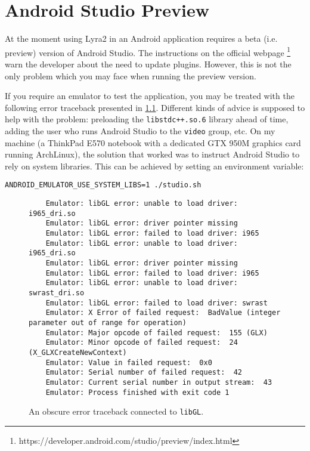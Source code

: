 \chapter{Android Studio Preview}
\label{chapter:problem?}

At the moment using Lyra2 in an Android application requires a beta (i.e. preview) version of Android Studio. The instructions on the official webpage \footnote{https://developer.android.com/studio/preview/index.html} warn the developer about the need to update plugins. However, this is not the only problem which you may face when running the preview version.

If you require an emulator to test the application, you may be treated with the following  error traceback presented in \ref{fig:traceback}. Different kinds of advice is supposed to help with the problem: preloading the \texttt{libstdc++.so.6} library ahead of time, adding the user who runs Android Studio to the \texttt{video} group, etc. On my machine (a ThinkPad E570 notebook with a dedicated GTX 950M graphics card running ArchLinux), the solution that worked was to instruct Android Studio to rely on system libraries. This can be achieved by setting an environment variable:

\begin{verbatim}
ANDROID_EMULATOR_USE_SYSTEM_LIBS=1 ./studio.sh
  \end{verbatim}

\begin{figure}
\begin{verbatim}
    Emulator: libGL error: unable to load driver: i965_dri.so
    Emulator: libGL error: driver pointer missing
    Emulator: libGL error: failed to load driver: i965
    Emulator: libGL error: unable to load driver: i965_dri.so
    Emulator: libGL error: driver pointer missing
    Emulator: libGL error: failed to load driver: i965
    Emulator: libGL error: unable to load driver: swrast_dri.so
    Emulator: libGL error: failed to load driver: swrast
    Emulator: X Error of failed request:  BadValue (integer parameter out of range for operation)
    Emulator: Major opcode of failed request:  155 (GLX)
    Emulator: Minor opcode of failed request:  24 (X_GLXCreateNewContext)
    Emulator: Value in failed request:  0x0
    Emulator: Serial number of failed request:  42
    Emulator: Current serial number in output stream:  43
    Emulator: Process finished with exit code 1
\end{verbatim}
\caption{An obscure error traceback connected to \texttt{libGL}.}
\label{fig:traceback}
\end{figure}
